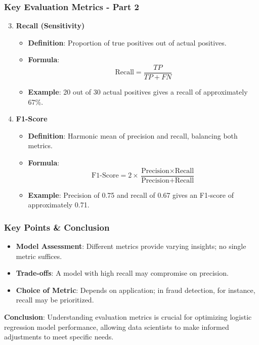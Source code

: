 \documentclass[aspectratio=169]{beamer}
\begin{document}
\begin{frame}[fragile]
    \frametitle{Key Evaluation Metrics - Part 2}
    \begin{enumerate}
        \setcounter{enumi}{2} %
        \item \textbf{Recall (Sensitivity)}
        \begin{itemize}
            \item \textbf{Definition}: Proportion of true positives out of actual positives.
            \item \textbf{Formula}:
            \begin{equation}
            \text{Recall} = \frac{TP}{TP + FN}
            \end{equation}
            \item \textbf{Example}: 20 out of 30 actual positives gives a recall of approximately 67\%.
        \end{itemize}
        
        \item \textbf{F1-Score}
        \begin{itemize}
            \item \textbf{Definition}: Harmonic mean of precision and recall, balancing both metrics.
            \item \textbf{Formula}:
            \begin{equation}
            \text{F1-Score} = 2 \times \frac{\text{Precision} \times \text{Recall}}{\text{Precision} + \text{Recall}}
            \end{equation}
            \item \textbf{Example}: Precision of 0.75 and recall of 0.67 gives an F1-score of approximately 0.71.
        \end{itemize}
    \end{enumerate}
\end{frame}

\begin{frame}[fragile]
    \frametitle{Key Points & Conclusion}
    \begin{itemize}
        \item \textbf{Model Assessment}: Different metrics provide varying insights; no single metric suffices.
        \item \textbf{Trade-offs}: A model with high recall may compromise on precision.
        \item \textbf{Choice of Metric}: Depends on application; in fraud detection, for instance, recall may be prioritized.
    \end{itemize}
    
    \vspace{1em}
    \textbf{Conclusion}:
    Understanding evaluation metrics is crucial for optimizing logistic regression model performance, allowing data scientists to make informed adjustments to meet specific needs.
\end{frame}
\end{document}
